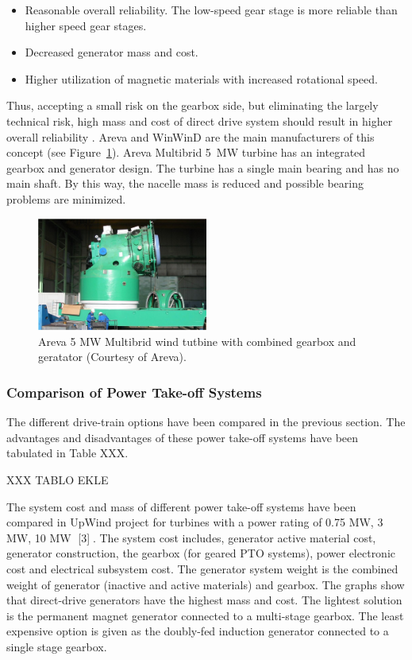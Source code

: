 \documentclass[a4paper, 11pt]{article} %
\begin{document}
\begin{itemize}
	\item Reasonable overall reliability. The low-speed gear stage is more reliable than higher speed gear stages.
	\item Decreased generator mass and cost.
	\item Higher utilization of magnetic materials with increased rotational speed.
\end{itemize}


Thus, accepting a small risk on the gearbox side, but eliminating the largely technical risk, high mass and cost of direct drive system should result in higher overall reliability \cite{Bohmeke2003}. Areva and WinWinD are the main manufacturers of this concept (see Figure~\ref{multibrid}). Areva Multibrid 5~MW turbine has an integrated gearbox and generator design. The turbine has a single main bearing and has no main shaft. By this way, the nacelle mass is reduced and possible bearing problems are minimized. 

  \begin{figure}
    \centering
    \includegraphics[width=0.5\textwidth]{multibrid}
    \caption{Areva 5 MW Multibrid wind tutbine with combined gearbox and geratator (Courtesy of Areva).} 
    \label{multibrid}
  \end{figure}

\subsubsection{Comparison of Power Take-off Systems}


The different drive-train options have been compared in the previous section. The advantages and disadvantages of these power take-off systems have been tabulated in Table XXX.


XXX TABLO EKLE

The system cost and mass of different power take-off systems have been compared in UpWind project for turbines with a power rating of 0.75 MW, 3 MW, 10 MW [3]. The system cost includes, generator active material cost, generator construction, the gearbox (for geared PTO systems), power electronic cost and electrical subsystem cost. The generator system weight is the combined weight of generator (inactive and active materials) and gearbox. The graphs show that direct-drive generators have the highest mass and cost. The lightest solution is the permanent magnet generator connected to a multi-stage gearbox. The least expensive option is given as the doubly-fed induction generator connected to a single stage gearbox.
\end{document}
